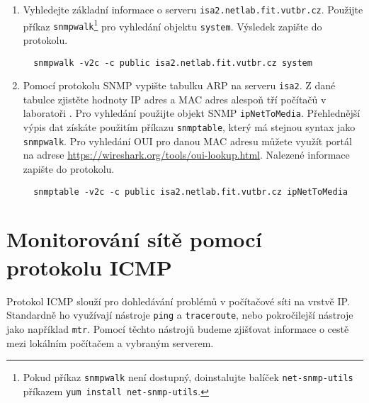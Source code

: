 \documentclass[a4paper,11pt]{article}
\begin{document}
\begin{enumerate}
\item Vyhledejte základní informace o serveru {\tt isa2.netlab.fit.vutbr.cz}.  Použijte příkaz {\tt snmpwalk}\footnote{Pokud příkaz {\tt snmpwalk} není dostupný, doinstalujte balíček \texttt{net-snmp-utils} příkazem \texttt{yum install net-snmp-utils}.} pro vyhledání objektu \texttt{system}. %
  Výsledek zapište do protokolu. 
\begin{verbatim}
  snmpwalk -v2c -c public isa2.netlab.fit.vutbr.cz system
\end{verbatim}
\item Pomocí protokolu SNMP vypište tabulku ARP na serveru {\tt isa2}. Z dané tabulce zjistěte  hodnoty IP adres a MAC adres alespoň tří počítačů v laboratoři . Pro vyhledání použijte objekt SNMP \texttt{ipNetToMedia}. Přehlednější výpis dat získáte použitím příkazu \texttt{snmptable}, který má stejnou syntax jako \texttt{snmpwalk}. Pro vyhledání OUI pro danou MAC adresu můžete využít portál na adrese \url{https://wireshark.org/tools/oui-lookup.html}. Nalezené informace zapište do protokolu. 
\begin{verbatim}
  snmptable -v2c -c public isa2.netlab.fit.vutbr.cz ipNetToMedia
\end{verbatim}
\end{enumerate}

\section{Monitorování sítě pomocí protokolu ICMP}
Protokol ICMP slouží pro dohledávání problémů v počítačové síti na vrstvě IP. Standardně ho využívají nástroje \texttt{ping} a \texttt{traceroute}, nebo pokročilejší nástroje jako například \texttt{mtr}. Pomocí těchto nástrojů budeme zjišťovat informace o cestě mezi lokálním počítačem a vybraným serverem.
\end{document}
